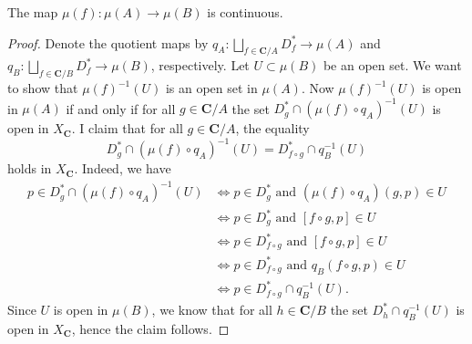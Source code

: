 \begin{lemma}
The map $\mu(f) : \mu(A) \to \mu(B)$ is continuous.
\end{lemma}
\begin{proof}
Denote the quotient maps by $q_A : \bigsqcup_{f \in \mathbf{C}/A} D_f^* \to \mu(A)$ and $q_B : \bigsqcup_{f \in \mathbf{C}/B} D_f^* \to \mu(B)$, respectively. Let $U \subset \mu(B)$ be an open set. 
We want to show that $\mu(f)^{-1}(U)$ is an open set in $\mu(A)$. Now $\mu(f)^{-1}(U)$ is open in $\mu(A)$ if and only if for all $g \in \mathbf{C}/A$ the set $D_g^* \cap \left(\mu(f) \circ q_A \right)^{-1}\left(U \right)$ is open in $X_{\mathbf{C}}$. 
I claim that for all $g \in \mathbf{C}/A$, the equality
\[ D_g^* \cap \left(\mu(f) \circ q_A \right)^{-1} \left( U \right) = D^*_{f \circ g} \cap q_B^{-1} \left(U \right) \]
holds in $X_\mathbf{C}$.
Indeed, we have
\begin{align*}
p \in D_g^* \cap \left( \mu(f) \circ q_A \right)^{-1}\left(U \right) &\iff p \in D_g^* \text{ and } \left( \mu(f) \circ q_A \right)(g,p) \in U \\
&\iff p \in D_g^* \text{ and } [f \circ g, p] \in U \\
&\iff p \in D_{f \circ g}^* \text{ and } [f \circ g, p] \in U \\
&\iff p \in D_{f \circ g}^* \text{ and } q_B(f \circ g, p ) \in U \\
&\iff p \in D_{f \circ g}^* \cap q_B^{-1} \left( U \right).
\end{align*}
Since $U$ is open in $\mu(B)$, we know that for all $h \in \mathbf{C}/B$ the set $D_h^* \cap q_B^{-1}(U)$ is open in $X_{\mathbf{C}}$, hence the claim follows.
\end{proof}


